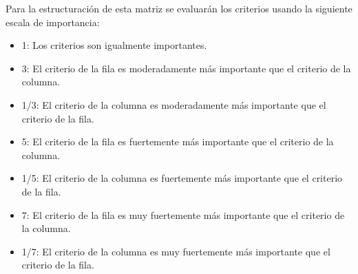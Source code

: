 \documentclass[
  11pt,
  bookmarksnumbered]{article}
\begin{document}
Para la estructuración de esta matriz se evaluarán los criterios usando la siguiente escala de importancia:

\begin{itemize}
\item
  1: Los criterios son igualmente importantes.
\item
  3: El criterio de la fila es moderadamente más importante que el criterio de la columna.
\item
  1/3: El criterio de la columna es moderadamente más importante que el criterio de la fila.
\item
  5: El criterio de la fila es fuertemente más importante que el criterio de la columna.
\item
  1/5: El criterio de la columna es fuertemente más importante que el criterio de la fila.
\item
  7: El criterio de la fila es muy fuertemente más importante que el criterio de la columna.
\item
  1/7: El criterio de la columna es muy fuertemente más importante que el criterio de la fila.
\end{itemize}
\end{document}
